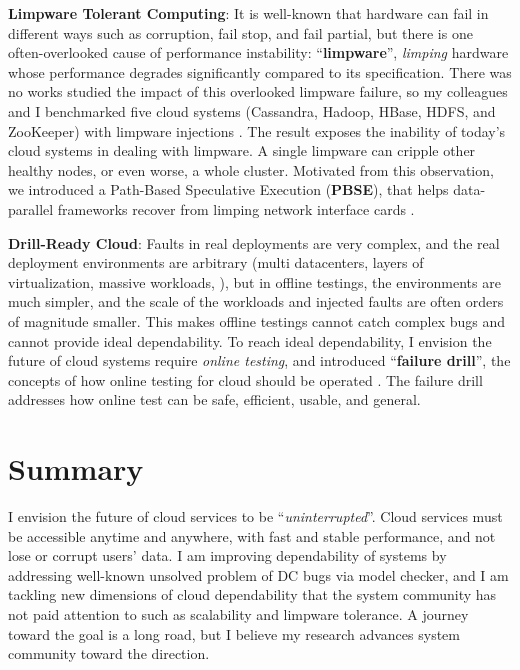 \documentclass[10pt]{article}
\begin{document}
\noindent
\textbf{Limpware Tolerant Computing}: It is well-known that hardware can fail in
different ways such as corruption, fail stop, and fail partial, but there is one
often-overlooked cause of performance instability:
``\textbf{limpware}'', \textit{limping} hardware whose performance
degrades significantly compared to its specification. There was no works
studied the impact of this overlooked limpware failure, so my colleagues and I
benchmarked five cloud systems (Cassandra, Hadoop, HBase, HDFS, and ZooKeeper)
with limpware injections \cite{Do+13-Limplock}. The result exposes the inability
of today's cloud systems in dealing with limpware. A single limpware can cripple
other healthy nodes, or even worse, a whole cluster. Motivated from this
observation, we introduced a Path-Based Speculative Execution
(\textbf{PBSE}), that helps data-parallel frameworks recover from limping
network interface cards \cite{Suminto+17-PBSE-InPrep}.


\noindent
\textbf{Drill-Ready Cloud}: Faults in real deployments are very complex, and
the real deployment environments are arbitrary (multi datacenters, layers of
virtualization, massive workloads, \etc), but in offline testings, the
environments are much simpler, and the scale of the workloads and injected
faults are often orders of magnitude smaller. This makes offline testings cannot
catch complex bugs and cannot provide ideal dependability.  To reach ideal
dependability, I envision the future of cloud systems require \textit{online
testing}, and introduced ``\textbf{failure drill}'', the concepts of how online
testing for cloud should be operated \cite{Leesatapornwongsa+14-Drill-fixed}.
The failure drill addresses how online test can be safe, efficient, usable, and
general.

\section{Summary}

I envision the future of cloud services to be ``\textit{uninterrupted}''. Cloud
services must be accessible anytime and anywhere, with fast and stable
performance, and not lose or corrupt users' data.
%
I am improving dependability of systems by addressing well-known unsolved
problem of DC bugs via model checker, and I am tackling new dimensions of cloud
dependability that the system community has not paid attention to such as
scalability and limpware tolerance.  A journey toward the goal is a long road,
but I believe my research advances system community toward the direction. 


\end{document}
